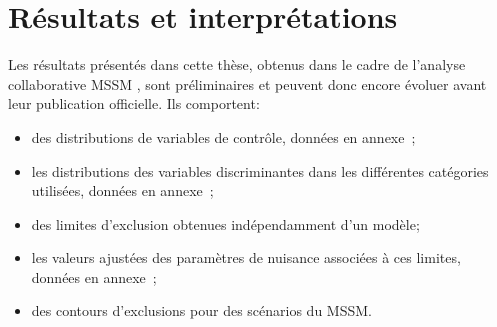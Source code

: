 \section{Résultats et interprétations}\label{chapter-HTT_analysis-section-results}
Les résultats présentés dans cette thèse,
obtenus dans le cadre de l'analyse collaborative MSSM \HAtoTauTau,
sont préliminaires
et
peuvent donc encore évoluer avant leur publication officielle.
Ils comportent:
\begin{itemize}
\item des distributions de variables de contrôle, données en annexe~;
\item les distributions des variables discriminantes dans les différentes catégories utilisées, données en annexe~;
\item des limites d'exclusion obtenues indépendamment d'un modèle;
\item les valeurs ajustées des paramètres de nuisance associées à ces limites, données en annexe~;
\item des contours d'exclusions
pour des scénarios du MSSM.
\end{itemize}
